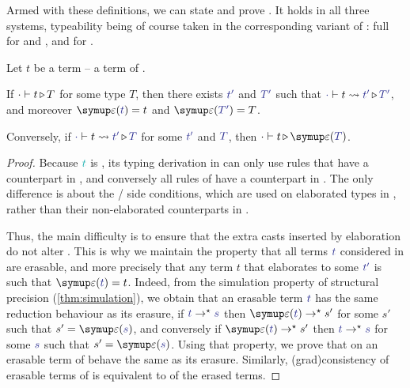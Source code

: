 Armed with these definitions, we can state and prove .
It holds in all three systems, typeability being of course taken in
the corresponding variant of :
full  for  and , and  for .

\begin{theorem}
	\label{thm:conservativity}

	Let $t$ be a  term – \ie a term of .

  If $\cdot \vdash t \operatorname{\triangleright} T$ for some type $T$,
  then there exists $\tcol{t'}$ and $\tcol{T'}$ such that
  $\inferelab{\emptycon}{\ccol{t}}{t'}{T'}$, and
  moreover $\eras(\tcol{t}) = t$ and $\eras(\tcol{T'}) = T$.
  
  Conversely, if $\inferelab{\emptycon}{\ccol{t}}{t'}{T}$ for some $\tcol{t'}$ and $\tcol{T}$,
  then $\emptycon \vdash t \ity \eras(\tcol{T})$.
\end{theorem}

\begin{proof}

	Because $\scol{t}$ is , its typing derivation in 
  can only use rules that have a counterpart in ,
  and conversely all rules of  have a counterpart in .
  The only difference is about the / side conditions,
  which are used on elaborated types in ,
  rather than their non-elaborated counterparts in .

	Thus, the main difficulty is to ensure that the extra casts
  inserted by elaboration do not alter . This is why we
  maintain the property that all terms $\tcol{t}$ considered in
   are erasable, and more precisely that any  term $t$
  that elaborates to some $\tcol{t'}$ is such that
  $\eras(\tcol{t}) = t$. Indeed, from the simulation property of
  structural precision (\cref{thm:simulation}), we obtain that an
  erasable term $\tcol{t}$ has the same reduction behaviour as
  its erasure, \ie if $\tcol{t} \red \tcol{s}$ then
  $\eras(\tcol{t}) \red s'$ for some $s'$ such that $s' = \eras(\tcol{s})$,
  and conversely if $\eras(\tcol{t}) \red s'$
  then $\tcol{t} \red \tcol{s}$ for some $\tcol{s}$ such that $s' = \eras(\tcol{s})$.
  Using that property, we  prove that
   on an erasable term of  behave
  the same as its erasure. Similarly, \kl(grad){consistency} of erasable terms of 
  is equivalent to  of the erased terms.
\end{proof}

